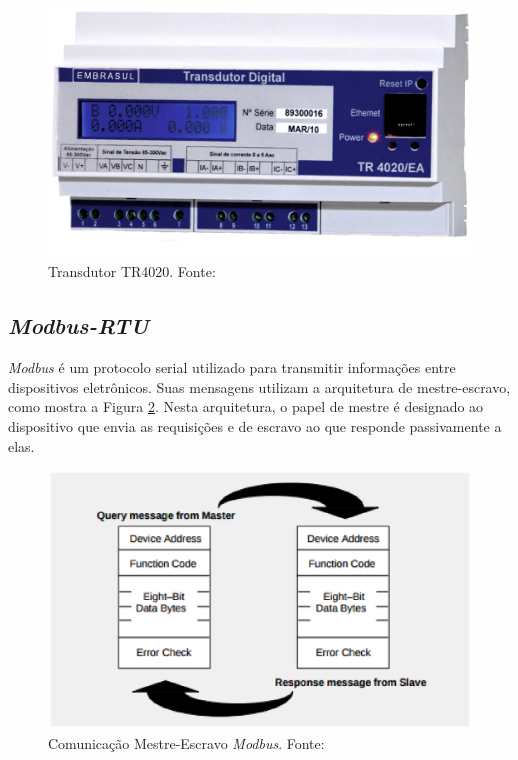 \begin{figure}[!h]
    \centering
    \includegraphics[keepaspectratio=true,scale=0.5]{figuras/tr4020.eps}
    \caption{Transdutor TR4020. Fonte: \cite{embrasul}}
    \label{tr4020}
\end{figure}

    \subsection{\textit{Modbus-RTU}}

    \textit{Modbus} \cite{modbus} é um protocolo serial utilizado para transmitir informações entre dispositivos eletrônicos. Suas mensagens utilizam a arquitetura de mestre-escravo, como mostra a Figura \ref{mestre_escravo}. Nesta arquitetura, o papel de mestre é designado ao dispositivo que envia as requisições e de escravo ao que responde passivamente a elas.

    \begin{figure}[!htb]
        \centering
        \includegraphics[keepaspectratio=true,scale=0.8]{figuras/mestre_escravo.eps}
        \caption{Comunicação Mestre-Escravo \textit{Modbus}. Fonte: \cite{modbus}}
        \label{mestre_escravo}
    \end{figure}

